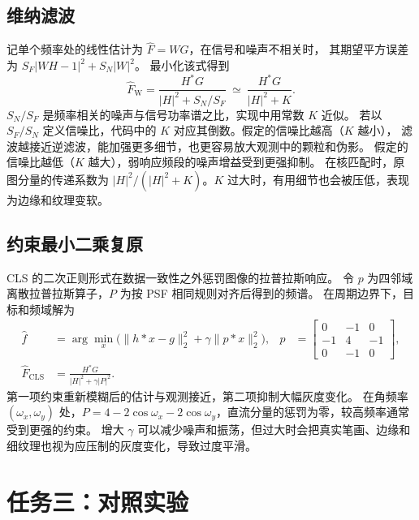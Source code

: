 \documentclass[UTF8,a4paper,zihao=5,fontset=fandol,twoside]{ctexart}
\begin{document}
\subsection{维纳滤波}
记单个频率处的线性估计为 \(\widehat F=WG\)，在信号和噪声不相关时，
其期望平方误差为 \(S_F|WH-1|^2+S_N|W|^2\)。
最小化该式得到\cite{gonzalez2018dip}
\begin{equation}
\widehat F_{\mathrm W}=\frac{H^*G}{|H|^2+S_N/S_F}
\ \simeq\ \frac{H^*G}{|H|^2+K}.
\end{equation}
\(S_N/S_F\) 是频率相关的噪声与信号功率谱之比，实现中用常数 \(K\) 近似。
若以 \(S_F/S_N\) 定义信噪比，代码中的 \(K\) 对应其倒数。假定的信噪比越高（\(K\) 越小），
滤波越接近逆滤波，能加强更多细节，也更容易放大观测中的颗粒和伪影。
假定的信噪比越低（\(K\) 越大），弱响应频段的噪声增益受到更强抑制。
在核匹配时，原图分量的传递系数为 \(|H|^2/(|H|^2+K)\)。\(K\) 过大时，有用细节也会被压低，表现为边缘和纹理变软。

\subsection{约束最小二乘复原}
CLS 的二次正则形式在数据一致性之外惩罚图像的拉普拉斯响应。
令 \(p\) 为四邻域离散拉普拉斯算子，\(P\) 为按 PSF 相同规则对齐后得到的频谱。
在周期边界下，目标和频域解为
\begin{align}
\widehat f&=\arg\min_x\bigl(\|h*x-g\|_2^2+\gamma\|p*x\|_2^2\bigr),&
p&=\begin{bmatrix}0&-1&0\\-1&4&-1\\0&-1&0\end{bmatrix},\\
\widehat F_{\mathrm{CLS}}&=\frac{H^*G}{|H|^2+\gamma|P|^2}.&&
\end{align}
第一项约束重新模糊后的估计与观测接近，第二项抑制大幅灰度变化。
在角频率 \((\omega_x,\omega_y)\) 处，\(P=4-2\cos\omega_x-2\cos\omega_y\)，直流分量的惩罚为零，较高频率通常受到更强的约束。
增大 \(\gamma\) 可以减少噪声和振荡，但过大时会把真实笔画、边缘和细纹理也视为应压制的灰度变化，导致过度平滑。

\section{任务三：对照实验}
\end{document}
